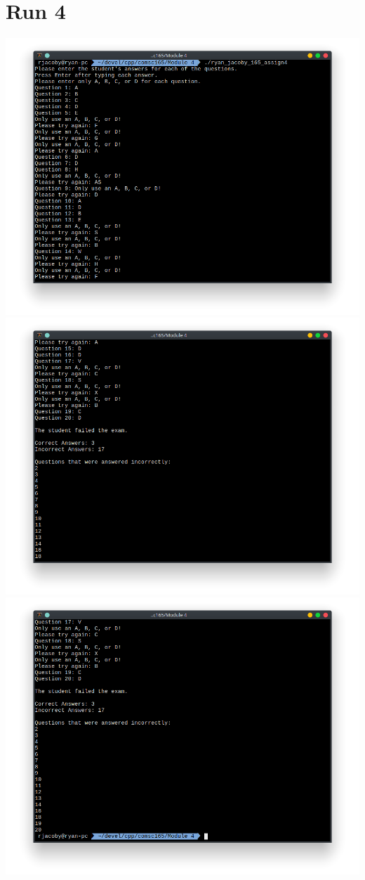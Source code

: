\documentclass[letterpaper, 11pt]{article}
\begin{document}
\section*{Run 4}
\includegraphics[scale=0.5]{run4_1.png} \\
\includegraphics[scale=0.5]{run4_2.png} \\
\includegraphics[scale=0.5]{run4_3.png}
\end{document}
